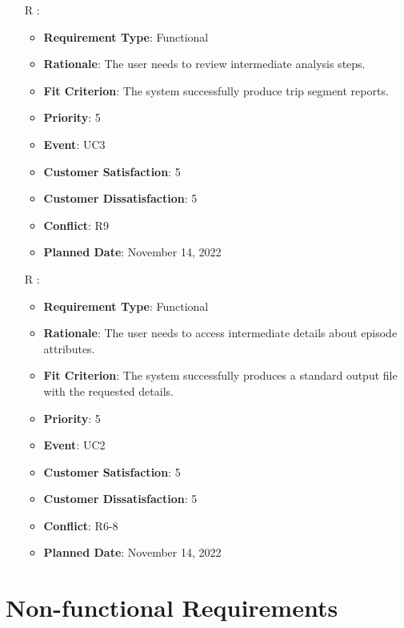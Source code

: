 \documentclass[12pt, titlepage]{article}
\newcounter{reqnum} %
\begin{document}
\begin{itemize}
\item[R\refstepcounter{reqnum}\thereqnum
\label{R_Inputs_1}:] 
\begin{itemize}
    \item \textbf{Requirement Type}: Functional
    \item \textbf{Rationale}: The user needs to review intermediate analysis steps. 
    \item \textbf{Fit Criterion}: The system successfully produce trip segment reports. 
    \item \textbf{Priority}: 5
    \item \textbf{Event}: UC3
    \item \textbf{Customer Satisfaction}: 5
    \item \textbf{Customer Dissatisfaction}: 5
    \item \textbf{Conflict}: R9
    \item \textbf{Planned Date}: November 14, 2022
\end{itemize}

\item[R\refstepcounter{reqnum}\thereqnum
\label{R_Inputs_1}:] 
\begin{itemize}
    \item \textbf{Requirement Type}: Functional
    \item \textbf{Rationale}: The user needs to access intermediate details about episode attributes.
    \item \textbf{Fit Criterion}: The system successfully produces a standard output file with the requested details.
    \item \textbf{Priority}: 5
    \item \textbf{Event}: UC2
    \item \textbf{Customer Satisfaction}: 5
    \item \textbf{Customer Dissatisfaction}: 5
    \item \textbf{Conflict}: R6-8
    \item \textbf{Planned Date}: November 14, 2022
\end{itemize}

\end{itemize}


\section{Non-functional Requirements}
\end{document}

